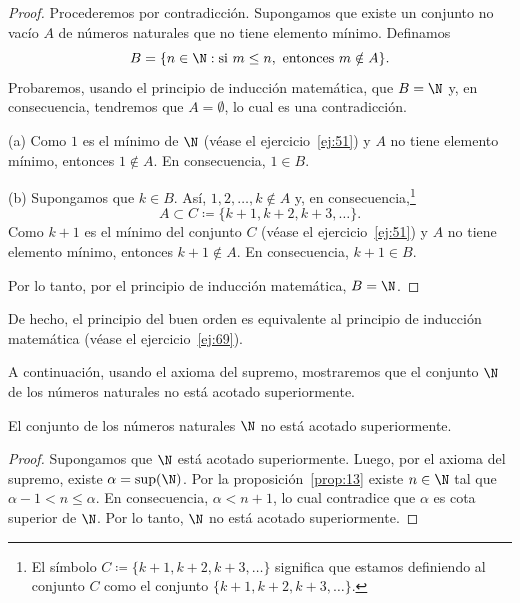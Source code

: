 \documentclass[12pt,a4paper]{book}
\begin{document}
    \begin{proof}
        Procederemos por contradicción. Supongamos que existe un
        conjunto no vacío $A$ de números naturales que no tiene elemento mínimo.
        Definamos
        \begin{equation*}
            B=\{n\in\N:\text{si }m\leq n,\text{ entonces }m\notin A\}.
        \end{equation*}
        Probaremos, usando el principio de inducción matemática, que $B=\N$ y, en
        consecuencia, tendremos que $A=\emptyset$, lo cual es una contradicción.

        (a) Como $1$ es el mínimo de $\N$ (véase el ejercicio~\ref{ej:51}) y $A$ no tiene elemento
        mínimo, entonces $1\notin A$. En consecuencia, $1\in B$.

        (b) Supongamos que $k\in B$. Así, $1,2,\ldots,k\notin A$ y, en consecuencia,\footnote{El símbolo $C\coloneqq\{k+1,k+2,k+3,\ldots\}$ significa que estamos definiendo al conjunto $C$
        como el conjunto $\{k+1,k+2,k+3,\ldots\}$.}
        \begin{equation*}
            A\subset C\coloneqq\{k+1,k+2,k+3,\ldots\}.
        \end{equation*}
        Como $k+1$ es el mínimo del conjunto $C$ (véase el ejercicio~\ref{ej:51}) y $A$ no tiene
        elemento mínimo, entonces $k+1\notin A$. En consecuencia, $k+1\in B$.

        Por lo tanto, por el principio de inducción matemática, $B=\N$.
    \end{proof}

    De hecho, el principio del buen orden es equivalente al principio de inducción
    matemática (véase el ejercicio~\ref{ej:69}).

    A continuación, usando el axioma del supremo, mostraremos que el conjunto
    $\N$ de los números naturales no está acotado superiormente.

    \begin{proposicion}\label{prop:17}
        El conjunto de los números naturales $\N$ no está acotado
        superiormente.
    \end{proposicion}

    \begin{proof}
        Supongamos que $\N$ está acotado superiormente. Luego, por el
        axioma del supremo, existe $\alpha=\sup(\N)$. Por la proposición~\ref{prop:13} existe $n\in\N$
        tal que $\alpha-1<n\leq\alpha$. En consecuencia, $\alpha<n+1$, lo cual contradice que $\alpha$
        es cota superior de $\N$. Por lo tanto, $\N$ no está acotado superiormente.
    \end{proof}
\end{document}
